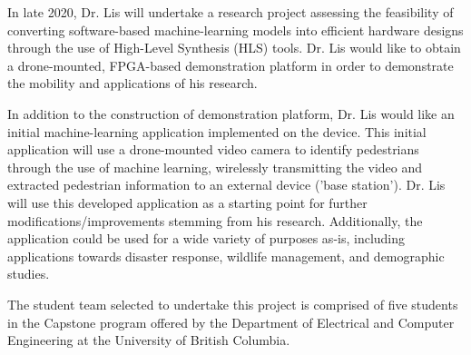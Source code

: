 In late 2020, Dr. Lis will undertake a research project assessing the feasibility of converting software-based machine-learning models into efficient hardware designs through the use of High-Level Synthesis (HLS) tools. Dr. Lis would like to obtain a drone-mounted, FPGA-based demonstration platform in order to demonstrate the mobility and applications of his research. 

In addition to the construction of demonstration platform, Dr. Lis would like an initial machine-learning application implemented on the device. This initial application will use a drone-mounted video camera to identify pedestrians through the use of machine learning, wirelessly transmitting the video and extracted pedestrian information to an external device ('base station'). Dr. Lis will use this developed application as a starting point for further modifications/improvements stemming from his research. Additionally, the application could be used for a wide variety of purposes as-is, including applications towards disaster response, wildlife management, and demographic studies.

The student team selected to undertake this project is comprised of five students in the Capstone program offered by the Department of Electrical and Computer Engineering at the University of British Columbia.